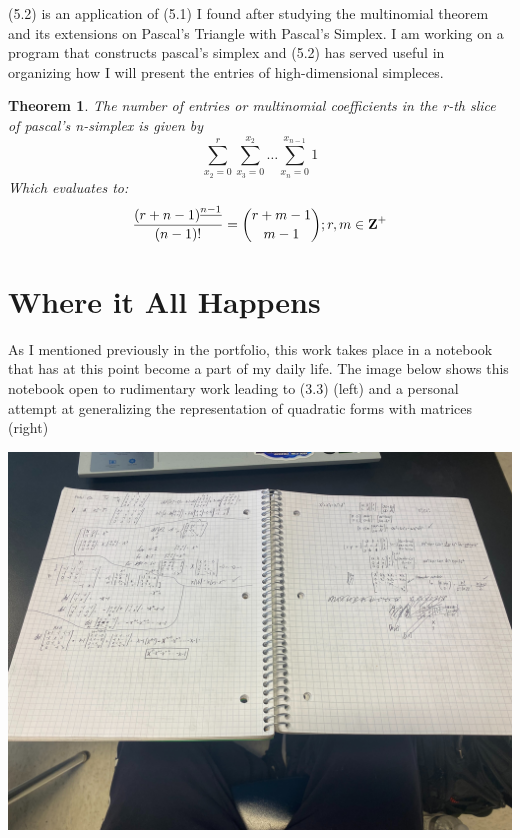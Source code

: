 \documentclass[11pt]{article}
\newtheorem{theorem}{Theorem}[section]
\begin{document}
(5.2) is an application of (5.1) I found after studying the multinomial theorem and its extensions on Pascal's Triangle with Pascal's Simplex. I am working on a program that constructs pascal's simplex and (5.2) has served useful in organizing how I will present the entries of high-dimensional simpleces.

\begin{theorem}
    The number of entries or multinomial coefficients in the r-th slice of pascal's n-simplex is given by 
    $$\sum_{x_2 = 0}^{r}\sum_{x_3 = 0}^{x_2}\dots\sum_{x_{n} = 0}^{x_{n-1}}1$$
    Which evaluates to:
    $$\frac{{(r+n-1)}^{\underline{n-1}}}{(n-1)!}={{r+m-1} \choose {m-1}};r,m\in\mbox{\textbf{Z}}^+$$
\end{theorem}

\section{Where it All Happens}
As I mentioned previously in the portfolio, this work takes place in a notebook that has at this point become a part of my daily life. The image below shows this notebook open to rudimentary work leading to (3.3) (left) and a personal attempt at generalizing the representation of quadratic forms with matrices (right)

\begin{center}
\includegraphics[scale=0.12]{image}
\end{center}
\end{document}
